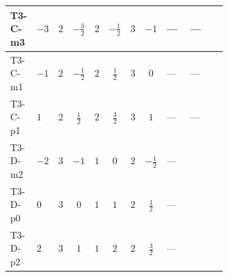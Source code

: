 \documentclass[8pt]{article}
\begin{document}
\begin{landscape}
\begin{longtable}{@{}llcccccc >{\raggedright\arraybackslash}p{0.21\linewidth} >{\raggedright\arraybackslash}p{0.21\linewidth} >{\raggedright\arraybackslash}p{0.21\linewidth}@{}}
\midrule
T3-C-m3 & $-3$ & $2$ & $-\frac{3}{2}$ & $2$ & $-\frac{1}{2}$ & $3$ & $-1$ & --- & --- & \scriptsize\adjustbox{max width=\linewidth}{$\begin{gathered} +3 {\lambda_5} \left({\lambda_5}\right)^{*}\end{gathered}$} \\
\midrule
T3-C-m1 & $-1$ & $2$ & $-\frac{1}{2}$ & $2$ & $\frac{1}{2}$ & $3$ & $0$ & --- & --- & \scriptsize\adjustbox{max width=\linewidth}{$\begin{gathered} +3 {\lambda_5} \left({\lambda_5}\right)^{*}\end{gathered}$} \\
\midrule
T3-C-p1 & $1$ & $2$ & $\frac{1}{2}$ & $2$ & $\frac{3}{2}$ & $3$ & $1$ & --- & --- & \scriptsize\adjustbox{max width=\linewidth}{$\begin{gathered} +3 {\lambda_5} \left({\lambda_5}\right)^{*}\end{gathered}$} \\
\midrule
T3-D-m2 & $-2$ & $3$ & $-1$ & $1$ & $0$ & $2$ & $-\frac{1}{2}$ & --- & \scriptsize\adjustbox{max width=\linewidth}{$\begin{gathered} -4 \operatorname{Tr}\!\left({y_1}\,\left({y_1}\right)^{\dagger}\,{y_2}\,\left({y_2}\right)^{\dagger}\right)\end{gathered}$} & \scriptsize\adjustbox{max width=\linewidth}{$\begin{gathered} +4 {\lambda_5} \left({\lambda_5}\right)^{*}\end{gathered}$} \\
\midrule
T3-D-p0 & $0$ & $3$ & $0$ & $1$ & $1$ & $2$ & $\frac{1}{2}$ & --- & \scriptsize\adjustbox{max width=\linewidth}{$\begin{gathered} -4 \operatorname{Tr}\!\left({y_1}\,\left({y_1}\right)^{\dagger}\,{y_2}\,\left({y_2}\right)^{\dagger}\right)\end{gathered}$} & \scriptsize\adjustbox{max width=\linewidth}{$\begin{gathered} +4 {\lambda_5} \left({\lambda_5}\right)^{*}\end{gathered}$} \\
\midrule
T3-D-p2 & $2$ & $3$ & $1$ & $1$ & $2$ & $2$ & $\frac{3}{2}$ & --- & \scriptsize\adjustbox{max width=\linewidth}{$\begin{gathered} -4 \operatorname{Tr}\!\left({y_1}\,\left({y_1}\right)^{\dagger}\,{y_2}\,\left({y_2}\right)^{\dagger}\right)\end{gathered}$} & \scriptsize\adjustbox{max width=\linewidth}{$\begin{gathered} +4 {\lambda_5} \left({\lambda_5}\right)^{*}\end{gathered}$} \\

\end{longtable}
\end{landscape}
\end{document}
